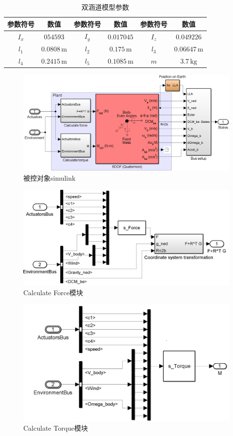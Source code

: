 \begin{table}
	\caption{\label{TDF_para}双涵道模型参数}
	\centering{}%
	\small 
	\begin{tabular}{cccccc}
		\hline 
		参数符号 & 数值&参数符号 & 数值&参数符号 & 数值\tabularnewline
		\hline 
		$ I_x $ & $ 054593 $ &$ I_y $ & $ 0.017045 $& $ I_z$ & $ 0.049226 $ \tabularnewline
	    $ l_{1} $ & $ 0.0808\,\text{m} $&$ l_{2} $ & $ 0.175\,\text{m} $ &$ l_3 $ & $ 0.06647\,\text{m} $ \tabularnewline 
		$ l_4 $ & $ 0.2415\,\text{m} $ &$ l_5 $ & $ 0.1085\,\text{m} $& $ m $ & $ 3.7\,\text{kg} $ \tabularnewline
		\hline 
	\end{tabular}	%
\end{table}
\begin{figure}[htbp]
	\centering
	\includegraphics[scale=0.35]{Fig/Fig_model.png}
	\caption{\label{fig_plant_simulink}被控对象simulink}
\end{figure}
\begin{figure}[htbp]
	\centering
	\includegraphics[scale=0.3]{Fig/Fig_Force.png}
	\caption{\label{fig_force_simulink}Calculate Force模块}
\end{figure}
\begin{figure}[htbp]
	\centering
	\includegraphics[scale=0.32]{Fig/Fig_Torque.png}
	\caption{\label{fig_moment_simulink}Calculate Torque模块}
\end{figure}
